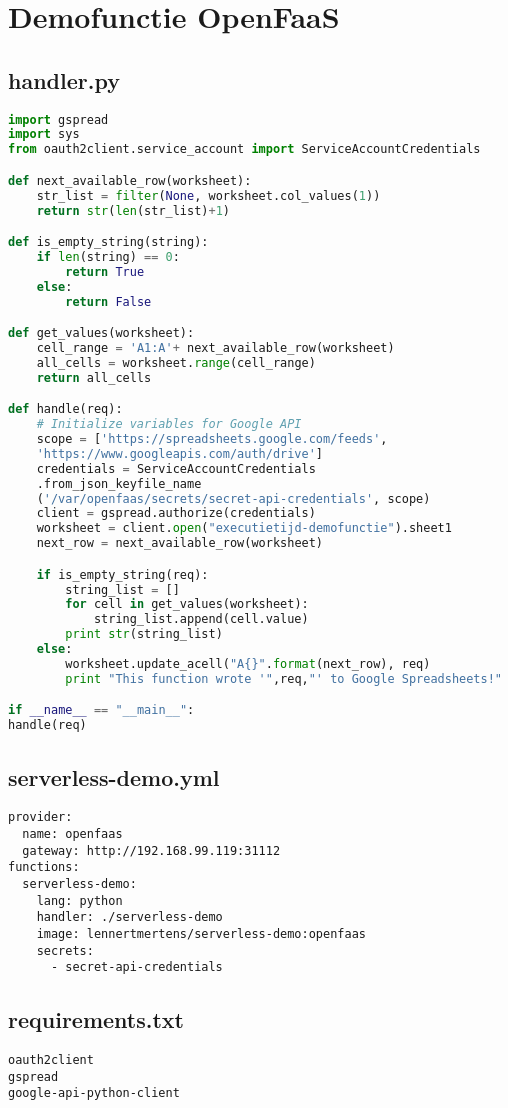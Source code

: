 \newpage
\section{Demofunctie OpenFaaS}
\subsection{handler.py}
\label{sec:demofunctie-openfaas}

\begin{lstlisting}[language=python]
import gspread
import sys
from oauth2client.service_account import ServiceAccountCredentials

def next_available_row(worksheet):
    str_list = filter(None, worksheet.col_values(1))
    return str(len(str_list)+1)

def is_empty_string(string):
    if len(string) == 0:
        return True
    else:
        return False

def get_values(worksheet):
    cell_range = 'A1:A'+ next_available_row(worksheet)
    all_cells = worksheet.range(cell_range)
    return all_cells

def handle(req):   
    # Initialize variables for Google API
    scope = ['https://spreadsheets.google.com/feeds',
    'https://www.googleapis.com/auth/drive']
    credentials = ServiceAccountCredentials
    .from_json_keyfile_name
    ('/var/openfaas/secrets/secret-api-credentials', scope)
    client = gspread.authorize(credentials)
    worksheet = client.open("executietijd-demofunctie").sheet1
    next_row = next_available_row(worksheet)

    if is_empty_string(req):
        string_list = []
        for cell in get_values(worksheet):
            string_list.append(cell.value)
        print str(string_list)
    else:
        worksheet.update_acell("A{}".format(next_row), req)
        print "This function wrote '",req,"' to Google Spreadsheets!"

if __name__ == "__main__":
handle(req)
\end{lstlisting}

\newpage
\subsection{serverless-demo.yml}
\label{sec:serverless-demo.yml}
\begin{lstlisting}
provider:
  name: openfaas
  gateway: http://192.168.99.119:31112
functions:
  serverless-demo:
    lang: python
    handler: ./serverless-demo
    image: lennertmertens/serverless-demo:openfaas
    secrets:
      - secret-api-credentials
\end{lstlisting}

\subsection{requirements.txt}
\label{sec:requirements.txt}
\begin{lstlisting}
oauth2client
gspread
google-api-python-client
\end{lstlisting}